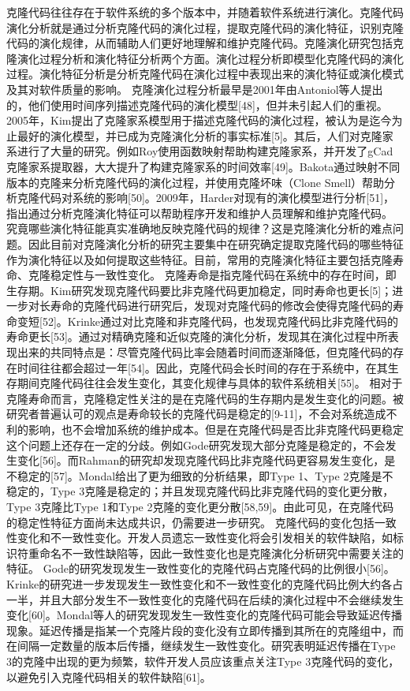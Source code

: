 克隆代码往往存在于软件系统的多个版本中，并随着软件系统进行演化。克隆代码演化分析就是通过分析克隆代码的演化过程，提取克隆代码的演化特征，识别克隆代码的演化规律，从而辅助人们更好地理解和维护克隆代码。克隆演化研究包括克隆演化过程分析和演化特征分析两个方面。演化过程分析即模型化克隆代码的演化过程。演化特征分析是分析克隆代码在演化过程中表现出来的演化特征或演化模式及其对软件质量的影响。
克隆演化过程分析最早是2001年由Antoniol等人提出的，他们使用时间序列描述克隆代码的演化模型[48]，但并未引起人们的重视。2005年，Kim提出了克隆家系模型用于描述克隆代码的演化过程，被认为是迄今为止最好的演化模型，并已成为克隆演化分析的事实标准[5]。其后，人们对克隆家系进行了大量的研究。例如Roy使用函数映射帮助构建克隆家系，并开发了gCad克隆家系提取器，大大提升了构建克隆家系的时间效率[49]。Bakota通过映射不同版本的克隆来分析克隆代码的演化过程，并使用克隆坏味（Clone Smell）帮助分析克隆代码对系统的影响[50]。2009年，Harder对现有的演化模型进行分析[51]，指出通过分析克隆演化特征可以帮助程序开发和维护人员理解和维护克隆代码。
究竟哪些演化特征能真实准确地反映克隆代码的规律？这是克隆演化分析的难点问题。因此目前对克隆演化分析的研究主要集中在研究确定提取克隆代码的哪些特征作为演化特征以及如何提取这些特征。目前，常用的克隆演化特征主要包括克隆寿命、克隆稳定性与一致性变化。
克隆寿命是指克隆代码在系统中的存在时间，即生存期。Kim研究发现克隆代码要比非克隆代码更加稳定，同时寿命也更长[5]；进一步对长寿命的克隆代码进行研究后，发现对克隆代码的修改会使得克隆代码的寿命变短[52]。Krinke通过对比克隆和非克隆代码，也发现克隆代码比非克隆代码的寿命更长[53]。通过对精确克隆和近似克隆的演化分析，发现其在演化过程中所表现出来的共同特点是：尽管克隆代码比率会随着时间而逐渐降低，但克隆代码的存在时间往往都会超过一年[54]。因此，克隆代码会长时间的存在于系统中，在其生存期间克隆代码往往会发生变化，其变化规律与具体的软件系统相关[55]。
相对于克隆寿命而言，克隆稳定性关注的是在克隆代码的生存期内是发生变化的问题。被研究者普遍认可的观点是寿命较长的克隆代码是稳定的[9-11]，不会对系统造成不利的影响，也不会增加系统的维护成本。但是在克隆代码是否比非克隆代码更稳定这个问题上还存在一定的分歧。例如Gode研究发现大部分克隆是稳定的，不会发生变化[56]。而Rahman的研究却发现克隆代码比非克隆代码更容易发生变化，是不稳定的[57]。Mondal给出了更为细致的分析结果，即Type 1、Type 2克隆是不稳定的，Type 3克隆是稳定的；并且发现克隆代码比非克隆代码的变化更分散，Type 3克隆比Type 1和Type 2克隆的变化更分散[58,59]。由此可见，在克隆代码的稳定性特征方面尚未达成共识，仍需要进一步研究。
克隆代码的变化包括一致性变化和不一致性变化。开发人员遗忘一致性变化将会引发相关的软件缺陷，如标识符重命名不一致性缺陷等，因此一致性变化也是克隆演化分析研究中需要关注的特征。 Gode的研究发现发生一致性变化的克隆代码占克隆代码的比例很小[56]。Krinke的研究进一步发现发生一致性变化和不一致性变化的克隆代码比例大约各占一半，并且大部分发生不一致性变化的克隆代码在后续的演化过程中不会继续发生变化[60]。Mondal等人的研究发现发生一致性变化的克隆代码可能会导致延迟传播现象。延迟传播是指某一个克隆片段的变化没有立即传播到其所在的克隆组中，而在间隔一定数量的版本后传播，继续发生一致性变化。研究表明延迟传播在Type 3的克隆中出现的更为频繁，软件开发人员应该重点关注Type 3克隆代码的变化，以避免引入克隆代码相关的软件缺陷[61]。
